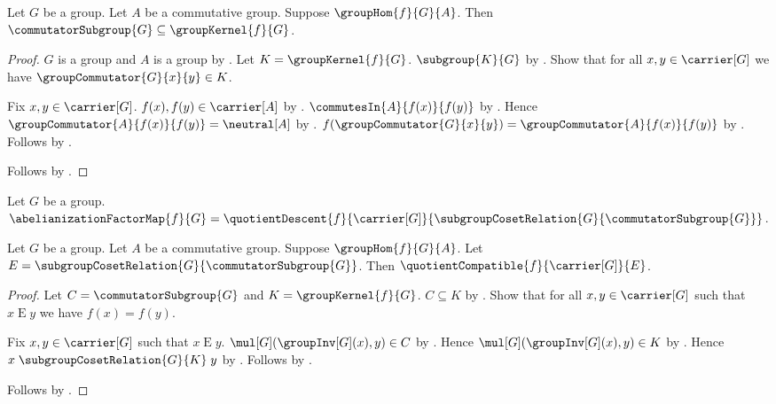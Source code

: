 \begin{theorem}\label{commutator_subgroup_subseteq_commutative_kernel}
    Let $G$ be a group.
    Let $A$ be a commutative group.
    Suppose $\groupHom{f}{G}{A}$.
    Then
        $\commutatorSubgroup{G}\subseteq\groupKernel{f}{G}$.
\end{theorem}
\begin{proof}
    $G$ is a group and $A$ is a group by
        .
    Let $K=\groupKernel{f}{G}$.
    $\subgroup{K}{G}$ by .
    Show that for all $x,y\in\carrier[G]$ we have
        $\groupCommutator{G}{x}{y}\in K$.
    \begin{subproof}
        Fix $x,y\in\carrier[G]$.
        $f(x),f(y)\in\carrier[A]$ by
            .
        $\commutesIn{A}{f(x)}{f(y)}$ by
            .
        Hence $\groupCommutator{A}{f(x)}{f(y)}=\neutral[A]$ by
            .
        $f(\groupCommutator{G}{x}{y})=
            \groupCommutator{A}{f(x)}{f(y)}$ by
            .
        Follows by
            .
    \end{subproof}
    Follows by .
\end{proof}

\begin{definition}\label{abelianization_factor_map}
    Let $G$ be a group.
    $\abelianizationFactorMap{f}{G}=
        \quotientDescent
            {f}{\carrier[G]}
            {\subgroupCosetRelation{G}{\commutatorSubgroup{G}}}$.
\end{definition}

\begin{proposition}\label{abelianization_factor_compatible}
    Let $G$ be a group.
    Let $A$ be a commutative group.
    Suppose $\groupHom{f}{G}{A}$.
    Let $E=\subgroupCosetRelation{G}{\commutatorSubgroup{G}}$.
    Then $\quotientCompatible{f}{\carrier[G]}{E}$.
\end{proposition}
\begin{proof}
    Let $C=\commutatorSubgroup{G}$ and
        $K=\groupKernel{f}{G}$.
    $C\subseteq K$ by
        .
    Show that for all $x,y\in\carrier[G]$ such that $x\mathrel{E}y$ we have
        $f(x)=f(y)$.
    \begin{subproof}
        Fix $x,y\in\carrier[G]$ such that $x\mathrel{E}y$.
        $\mul[G](\groupInv[G](x),y)\in C$ by
            .
        Hence $\mul[G](\groupInv[G](x),y)\in K$ by
            .
        Hence
            $x\mathrel{\subgroupCosetRelation{G}{K}}y$ by
            .
        Follows by .
    \end{subproof}
    Follows by .
\end{proof}

